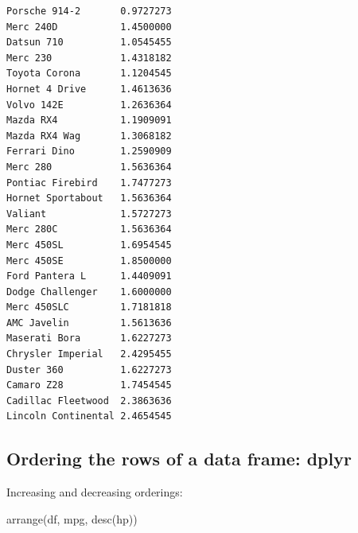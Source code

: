 \documentclass[
]{article}
\newenvironment{Shaded}{\begin{snugshade}}{\end{snugshade}}
\newcommand{\FunctionTok}[1]{\textcolor[rgb]{0.00,0.00,0.00}{#1}}
\newcommand{\NormalTok}[1]{#1}
\begin{document}
\begin{verbatim}
Porsche 914-2       0.9727273
Merc 240D           1.4500000
Datsun 710          1.0545455
Merc 230            1.4318182
Toyota Corona       1.1204545
Hornet 4 Drive      1.4613636
Volvo 142E          1.2636364
Mazda RX4           1.1909091
Mazda RX4 Wag       1.3068182
Ferrari Dino        1.2590909
Merc 280            1.5636364
Pontiac Firebird    1.7477273
Hornet Sportabout   1.5636364
Valiant             1.5727273
Merc 280C           1.5636364
Merc 450SL          1.6954545
Merc 450SE          1.8500000
Ford Pantera L      1.4409091
Dodge Challenger    1.6000000
Merc 450SLC         1.7181818
AMC Javelin         1.5613636
Maserati Bora       1.6227273
Chrysler Imperial   2.4295455
Duster 360          1.6227273
Camaro Z28          1.7454545
Cadillac Fleetwood  2.3863636
Lincoln Continental 2.4654545
\end{verbatim}

\hypertarget{ordering-the-rows-of-a-data-frame-dplyr-2}{%
\subsection{Ordering the rows of a data frame:
dplyr}\label{ordering-the-rows-of-a-data-frame-dplyr-2}}

Increasing and decreasing orderings:

\begin{Shaded}
\begin{Highlighting}[]
\FunctionTok{arrange}\NormalTok{(df, mpg, }\FunctionTok{desc}\NormalTok{(hp))}
\end{Highlighting}
\end{Shaded}
\end{document}
